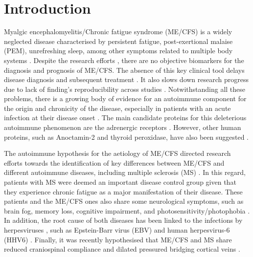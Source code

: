 \section{Introduction}

Myalgic encephalomyelitis/Chronic fatigue syndrome (ME/CFS) is a widely neglected disease characterised by persistent fatigue, post-exertional malaise (PEM), unrefreshing sleep, among other symptoms related to multiple body systems \citep{rivera2019MyalgicEncephalomyelitis}. Despite the research efforts \citep{scheibenbogen2017EuropeanME}, there are no objective biomarkers for the diagnosis and prognosis of ME/CFS. The absence of this key clinical tool delays disease diagnosis and subsequent treatment \citep{nacul2021EuropeanNetwork}. It also slows down research progress due to lack of finding's reproducibility across studies \citep{nacul2019HowHave, malato2023ImpactMisdiagnosis}. Notwithstanding all these problems, there is a growing body of evidence for an autoimmune component for the origin and chronicity of the disease, especially in patients with an acute infection at their disease onset \citep{sotznyMyalgicEncephalomyelitisChronic2018, blomberg2018InfectionEliciteda, sepulveda2019MyalgicEncephalomyelitis, steiner2020AutoimmunityRelatedRisk}. The main candidate proteins for this deleterious autoimmune phenomenon are the adrenergic receptors \citep{loebel2016AntibodiesAdrenergic, bynke2020AutoantibodiesBetaadrenergic, freitag2021AutoantibodiesVasoregulative}. However, other human proteins, such as Anoctamin-2 and thyroid peroxidase, have also been suggested \citep{loebel2017SerologicalProfiling, sepulveda2021ImpactGenetic}.

The autoimmune hypothesis for the aetiology of ME/CFS directed research efforts towards the identification of key differences between ME/CFS and different autoimmune diseases, including multiple sclerosis (MS) \citep{ramosRegulatoryNaturalKiller2016, loebel2017SerologicalProfiling}. In this regard, patients with MS were deemed an important disease control group given that they experience chronic fatigue as a major manifestation of their disease. These patients and the ME/CFS ones also share some neurological symptoms, such as brain fog, memory loss, cognitive impairment, and photosensitivity/photophobia \citep{morrisMyalgicEncephalomyelitisChronic2013}. In addition, the root cause of both diseases has been linked to the infections by herpesviruses \citep{rasa2018ChronicViral, ariza2021MyalgicEncephalomyelitis, sedighi2022ComprehensiveInvestigations, rasa-dzelzkaleja2023PersistentViral, khalesi2023AssociationHuman}, such as Epstein-Barr virus (EBV) \citep{ruiz-pablos2021EpsteinBarrVirus, bjornevik2022LongitudinalAnalysis, soldan2023EpsteinBarr} and human herpesvirus-6 (HHV6) \citep{engdahl2019IncreasedSerological, lee2021SalivaryDNA, lundstrom2022HumanHerpesvirus, kasimir2022TissueSpecific}. Finally, it was recently hypothesised that ME/CFS and MS share reduced craniospinal compliance and dilated pressured bridging cortical veins \citep{bateman2024ChronicFatigue}.

